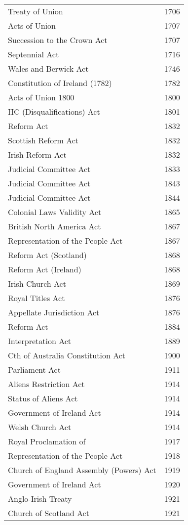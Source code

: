 \documentclass[14pt,titlepage]{extarticle}
\begin{document}
{\small
\begin{longtable}{l l}
Treaty of Union & 1706\\
Acts of Union & 1707\\
Succession to the Crown Act &  1707\\
Septennial Act & 1716\\
Wales and Berwick Act & 1746\\
Constitution of Ireland (1782) & 1782\\
Acts of Union 1800 & 1800\\
HC (Disqualifications) Act &  1801\\
Reform Act &  1832\\
Scottish Reform Act  & 1832\\
Irish Reform Act  & 1832\\
Judicial Committee Act  & 1833\\
Judicial Committee Act  & 1843\\
Judicial Committee Act  & 1844\\
Colonial Laws Validity Act & 1865\\
British North America Act  & 1867\\
Representation of the People Act &  1867\\
Reform Act (Scotland)  & 1868\\
Reform Act (Ireland)  & 1868\\
Irish Church Act & 1869\\
Royal Titles Act  & 1876\\
Appellate Jurisdiction Act & 1876\\
Reform Act  & 1884\\
Interpretation Act  & 1889\\
Cth of Australia Constitution Act & 1900\\
Parliament Act & 1911\\
Aliens Restriction Act & 1914\\
Status of Aliens Act  & 1914\\
Government of Ireland Act  & 1914\\
Welsh Church Act & 1914\\
Royal Proclamation of  & 1917\\
Representation of the People Act &  1918\\
Church of England Assembly (Powers) Act & 1919\\
Government of Ireland Act & 1920\\
Anglo-Irish Treaty & 1921\\
Church of Scotland Act  & 1921\\

\end{longtable}}
\end{document}
